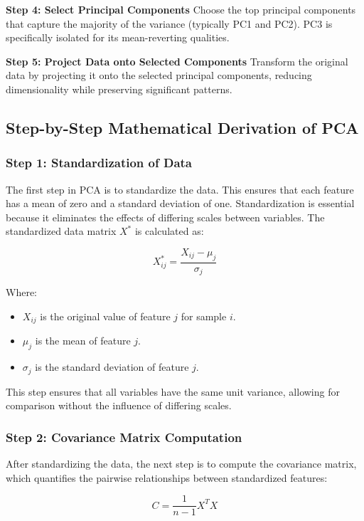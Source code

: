 \documentclass[12pt]{article}
\begin{document}
\textbf{Step 4: Select Principal Components}
Choose the top principal components that capture the majority of the variance (typically PC1 and PC2). PC3 is specifically isolated for its mean-reverting qualities.

\textbf{Step 5: Project Data onto Selected Components}
Transform the original data by projecting it onto the selected principal components, reducing dimensionality while preserving significant patterns.



\subsection{Step-by-Step Mathematical Derivation of PCA}
\subsubsection{Step 1: Standardization of Data}
The first step in PCA is to standardize the data. This ensures that each feature has a mean of zero and a standard deviation of one. Standardization is essential because it eliminates the effects of differing scales between variables. The standardized data matrix \(X^*\) is calculated as:

\[
X^*_{ij} = \frac{X_{ij} - \mu_j}{\sigma_j}
\]

Where:
\begin{itemize}
    \item \(X_{ij}\) is the original value of feature \(j\) for sample \(i\).
    \item \(\mu_j\) is the mean of feature \(j\).
    \item \(\sigma_j\) is the standard deviation of feature \(j\).
\end{itemize}

\vspace{1em}

This step ensures that all variables have the same unit variance, allowing for comparison without the influence of differing scales.

\subsubsection{Step 2: Covariance Matrix Computation}
After standardizing the data, the next step is to compute the covariance matrix, which quantifies the pairwise relationships between standardized features:

\[
C = \frac{1}{n - 1} X^T X
\]
\end{document}

